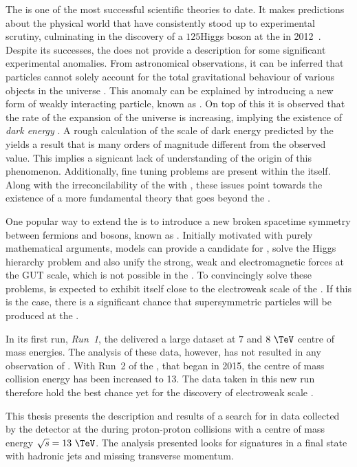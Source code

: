 The \SM is one of the most successful scientific theories to date. It
makes predictions about the physical world that have consistently
stood up to experimental scrutiny, culminating in the discovery of a
$125$\gev Higgs boson at the \LHC in
2012~\cite{1207.7214,1207.7235}.  Despite its successes, the \SM does
not provide a description for some significant experimental anomalies.
From astronomical observations, it can be inferred that \SM particles
cannot solely account for the total gravitational behaviour of various
objects in the universe
\cite{Kapteyn:1922zz,Oort:436532,Markevitch:2003at,2012Natur.487..202D,Ade:2015xua,0067-0049-180-2-225}.
This anomaly can be explained by introducing a new form of weakly
interacting particle, known as \emph{\DM}. On top of this it is
observed that the rate of the expansion of the universe is increasing,
implying the existence of \emph{dark energy}
\cite{Weinberg:1988cp,Riess:1998cb}.  A rough calculation of the scale
of dark energy predicted by the \SM yields a result that is many
orders of magnitude different from the observed value.  This implies a
signicant lack of understanding of the origin of this phenomenon.
Additionally, fine tuning problems are present within the \SM itself.
Along with the irreconcilability of the \SM with \GR, these issues
point towards the existence of a more fundamental theory 
that goes beyond the \SM. 

One popular way to extend the \SM is to introduce a new broken
spacetime symmetry between fermions and bosons, known as \SUSY
\cite{Martin:1997ns}.  Initially motivated with purely mathematical
arguments, \SUSY models can provide a candidate for \DM, solve the
Higgs hierarchy problem and also unify the strong, weak and
electromagnetic forces at the \ac{GUT} scale, which is not possible
in the \SM. To convincingly solve these problems, \SUSY is expected to
exhibit itself close to the electroweak scale of the \SM. If this is
the case, there is a significant chance that supersymmetric particles
will be produced at the \LHC. %

In its first run, \emph{Run~1}, the \LHC delivered a large dataset at
$7$ and $8~\tev$ centre of mass energies. The analysis of these data,
however, has not resulted in any observation of \SUSY. With Run~2 of
the \LHC, that began in 2015, the centre of mass collision energy has
been increased to 13\tev. The data taken in this new run therefore
hold the best chance yet for the discovery of electroweak scale \SUSY.

This thesis presents the description and results of a search for \SUSY
in data collected by the \CMS detector at the \LHC during
proton-proton collisions with a centre of mass energy $\sqrt{s} =
13~\tev$.  The analysis presented looks for \SUSY signatures in a
final state with hadronic jets and missing transverse momentum. 

